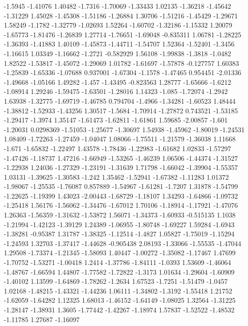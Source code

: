 \documentclass[9pt]{article}
\theoremstyle{plain}
\theoremstyle{definition}
\theoremstyle{remark}
\numberwithin{equation}{section}
\begin{document}
-1.5945
-1.41076
1.40482
-1.7316
-1.70069
-1.33433
1.02135
-1.36218
-1.45642
-1.31229
1.45028
-1.45308
-1.51186
-1.26884
1.30706
-1.51216
-1.45429
-1.29671
1.58249
-1.1782
-1.32779
-1.02693
1.52264
-1.60702
-1.32186
-1.15332
1.20079
-1.65773
-1.81476
-1.26839
1.27714
-1.76651
-1.69048
-0.835311
1.06781
-1.28225
-1.36393
-1.41883
1.40109
-1.45873
-1.44711
-1.54707
1.52364
-1.52401
-1.3456
-1.16615
1.03349
-1.16662
-1.2721
-0.582929
1.56108
-1.99838
-1.3818
-1.0482
1.82522
-1.53817
-1.45072
-1.29069
1.01782
-1.61697
-1.57878
-0.127757
1.60383
-1.25839
-1.65336
-1.07688
0.937001
-1.67304
-1.1578
-1.47465
0.954451
-2.01336
-1.49668
-1.05166
1.49282
-1.457
-1.43495
-0.823563
1.28777
-1.65666
-1.6212
-1.08914
1.29246
-1.59475
-1.63501
-1.28016
1.14323
-1.085
-1.72074
-1.2942
1.63938
-1.32775
-1.69719
-1.46785
0.794704
-1.4966
-1.34281
-1.60523
1.48444
-1.38812
-1.52933
-1.43256
1.30517
-1.5684
-1.70914
-1.27872
0.743521
-1.53185
-1.29417
-1.3974
1.35147
-1.61473
-1.62811
-1.61861
1.59685
-2.00857
-1.601
-1.20031
0.0298369
-1.51053
-1.25677
-1.30697
1.54938
-1.45962
-1.80019
-1.24531
1.08409
-1.72263
-1.27459
-1.04047
1.08066
-1.75511
-1.21579
-1.36038
1.11668
-1.671
-1.65832
-1.22497
1.43578
-1.78436
-1.22983
-1.61682
1.02833
-1.57297
-1.47426
-1.18737
1.47216
-1.66949
-1.53265
-1.46239
1.06506
-1.44374
-1.31527
-1.22938
1.24036
-1.27329
-1.23191
-1.31639
1.71798
-1.66042
-1.39904
-1.55357
1.03131
-1.39625
-1.30583
-1.242
1.35462
-1.52941
-1.67382
-1.11283
1.01372
-1.98067
-1.25535
-1.76087
0.857889
-1.54967
-1.61281
-1.7207
1.31878
-1.54799
-1.22625
-1.19399
1.43023
-2.00443
-1.68729
-1.18107
1.34293
-1.64866
-1.09732
-1.25418
1.56176
-1.56062
-1.34476
-1.67012
1.70106
-1.18914
-1.17921
-1.47076
1.26363
-1.56359
-1.31632
-1.53872
1.56071
-1.34373
-1.60933
-0.515135
1.1038
-1.21994
-1.42123
-1.39129
1.24389
-1.06955
-1.80748
-1.69227
1.59284
-1.6943
-1.38281
-0.95387
1.31787
-1.38325
-1.12514
-1.4827
1.05827
-1.75019
-1.15294
-1.24593
1.32703
-1.37417
-1.44628
-0.905438
2.08193
-1.33066
-1.55535
-1.47044
1.29508
-1.73374
-1.21345
-1.58093
1.40447
-1.00272
-1.35082
-1.17467
1.47699
-1.70752
-1.53271
-1.00418
1.2414
-1.37786
-1.84111
-1.0393
1.53609
-1.46064
-1.48767
-1.66594
1.44807
-1.77582
-1.72822
-1.3173
1.01634
-1.29604
-1.60909
-1.40102
1.13599
-1.64869
-1.78262
-1.2634
1.67523
-1.7251
-1.51479
-1.0457
1.02168
-1.48215
-1.43321
-1.44236
1.06111
-1.34802
-1.3192
-1.55418
1.21752
-1.62059
-1.64282
1.12325
1.68013
-1.46152
-1.64149
-1.08025
1.32564
-1.31225
-1.28147
-1.38931
1.3605
-1.77442
-1.42267
-1.18974
1.57837
-1.52522
-1.48532
-1.11785
1.27687
-1.16097
\end{document}
